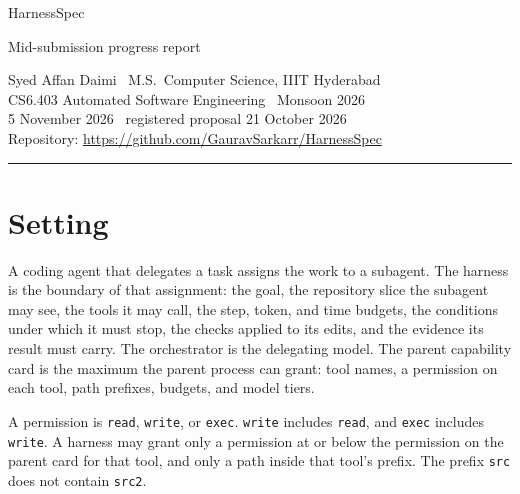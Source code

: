\documentclass[10pt,a4paper]{article}
\begin{document}
{\sffamily\LARGE HarnessSpec\par}
\vspace{0.15em}
{\sffamily\large Mid-submission progress report\par}
\vspace{0.35em}
{\small
Syed Affan Daimi \textperiodcentered\ M.S.\ Computer Science, IIIT Hyderabad\\
CS6.403 Automated Software Engineering \textperiodcentered\ Monsoon 2026\\
5 November 2026 \textperiodcentered\ registered proposal 21 October 2026\\
Repository: \url{https://github.com/GauravSarkarr/HarnessSpec}\par}
\vspace{0.25em}
\noindent\rule{\textwidth}{0.45pt}

\section{Setting}

A coding agent that delegates a task assigns the work to a subagent. The harness is the boundary of that assignment: the goal, the repository slice the subagent may see, the tools it may call, the step, token, and time budgets, the conditions under which it must stop, the checks applied to its edits, and the evidence its result must carry. The orchestrator is the delegating model. The parent capability card is the maximum the parent process can grant: tool names, a permission on each tool, path prefixes, budgets, and model tiers.

A permission is \texttt{read}, \texttt{write}, or \texttt{exec}. \texttt{write} includes \texttt{read}, and \texttt{exec} includes \texttt{write}. A harness may grant only a permission at or below the permission on the parent card for that tool, and only a path inside that tool's prefix. The prefix \texttt{src} does not contain \texttt{src2}.

\begin{center}
\label{fig:perm}
\end{center}
\end{document}
